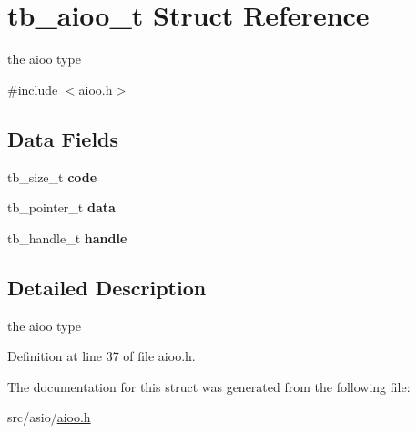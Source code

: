 \hypertarget{structtb__aioo__t}{\section{tb\-\_\-aioo\-\_\-t Struct Reference}
\label{structtb__aioo__t}
}


the aioo type  




{\ttfamily \#include $<$aioo.\-h$>$}

\subsection*{Data Fields}
\begin{DoxyCompactItemize}
\item 
\hypertarget{structtb__aioo__t_a902b41df83836a97b71c8cbca913ed6a}{tb\-\_\-size\-\_\-t {\bfseries code}}\label{structtb__aioo__t_a902b41df83836a97b71c8cbca913ed6a}

\item 
\hypertarget{structtb__aioo__t_af93ff7bef585c29efbc24a6143f9b6eb}{tb\-\_\-pointer\-\_\-t {\bfseries data}}\label{structtb__aioo__t_af93ff7bef585c29efbc24a6143f9b6eb}

\item 
\hypertarget{structtb__aioo__t_aafe22aecb37a110248e70b0d275a7429}{tb\-\_\-handle\-\_\-t {\bfseries handle}}\label{structtb__aioo__t_aafe22aecb37a110248e70b0d275a7429}

\end{DoxyCompactItemize}


\subsection{Detailed Description}
the aioo type 

Definition at line 37 of file aioo.\-h.



The documentation for this struct was generated from the following file\-:\begin{DoxyCompactItemize}
\item 
src/asio/\hyperlink{aioo_8h}{aioo.\-h}\end{DoxyCompactItemize}
